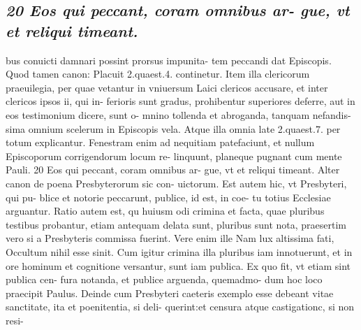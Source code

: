 \documentclass{article}
\begin{document}
\begin{pages}
\subsection*{\textit{20 Eos qui peccant, coram omnibus ar- gue, vt et reliqui timeant.}}bus conuicti damnari possint prorsus impunita- tem peccandi dat Episcopis. Quod tamen canon: Placuit 2.quaest.4. continetur. Item illa clericorum praeuilegia, per quae vetantur in vniuersum Laici clericos accusare, et inter clericos ipsos ii, qui in- ferioris sunt gradus, prohibentur superiores deferre, aut in eos testimonium dicere, sunt o- mnino tollenda et abroganda, tanquam nefandis- sima omnium scelerum in Episcopis vela. Atque illa omnia late 2.quaest.7. per totum explicantur. Fenestram enim ad nequitiam patefaciunt, et nullum Episcoporum corrigendorum locum re- linquunt, planeque pugnant cum mente Pauli. 20 Eos qui peccant, coram omnibus ar- gue, vt et reliqui timeant. Alter canon de poena Presbyterorum sic con- uictorum. Est autem hic, vt Presbyteri, qui pu- blice et notorie peccarunt, publice, id est, in coe- tu totius Ecclesiae arguantur. Ratio autem est, qu huiusm odi crimina et facta, quae pluribus testibus probantur, etiam antequam delata sunt, pluribus sunt nota, praesertim vero si a Presbyteris commissa fuerint. Vere enim ille Nam lux altissima fati, Occultum nihil esse sinit. Cum igitur crimina illa pluribus iam innotuerunt, et in ore hominum et cognitione versantur, sunt iam publica. Ex quo fit, vt etiam sint publica cen- fura notanda, et publice arguenda, quemadmo- dum hoc loco praecipit Paulus. Deinde cum Presbyteri caeteris exemplo esse debeant vitae sanctitate, ita et poenitentia, si deli- querint:et censura atque castigationc, si non resi-  \pend

\end{pages}
\end{document}
